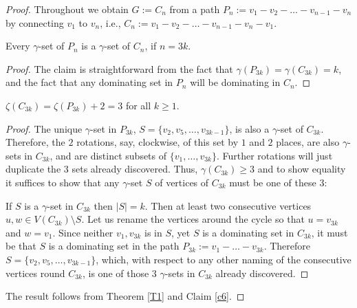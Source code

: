 \documentclass[twoside,12pt]{article}
\begin{document}
\begin{proof}
	Throughout we obtain $G:=C_n$ from a path $P_{n}:=v_1-v_2-\ldots-v_{n-1}-v_{n}$ by connecting $v_1$ to $v_n$, i.e., $C_{n}:=v_1-v_2-\ldots-v_{n-1}-v_{n}-v_1$.
	\begin{claim}{\label{c5}}
		Every $\gamma$-set of $P_n$ is a $\gamma$-set of $C_n$, if $n=3k$.
	\end{claim}
	\begin{proof}
		The claim is straightforward from the fact that $\gamma(P_{3k})=\gamma(C_{3k})=k$, and the fact that any dominating set in $P_n$ will be dominating in $C_n$.
	\end{proof}

	\begin{claim}{\label{c6}}
		$\zeta(C_{3k})=\zeta(P_{3k})+2 = 3$ for all $k\ge 1$.  
	\end{claim}
	\begin{proof}
	The unique $\gamma$-set in $P_{3k}$, $S=\{v_2,v_5,\ldots,v_{3k-1}\}$, is also a $\gamma$-set of $C_{3k}$. Therefore, the $2$ rotations, say, clockwise, of this set by $1$ and $2$ places, are also $\gamma$-sets in $C_{3k}$, and are distinct subsets of $\{v_1,\ldots,v_{3k}\}$. Further rotations will just duplicate the $3$ sets already discovered. Thus, $\gamma(C_{3k})\ge 3$ and to show equality it suffices to show that any $\gamma$-set $S$ of vertices of  $C_{3k}$ must be one of these $3$:
	
	If $S$ is a $\gamma$-set in $C_{3k}$ then $|S|=k$. Then at least two consecutive vertices $u, w \in V(C_{3k}) \setminus S$. Let us rename the vertices around the cycle so that $u=v_{3k}$ and $w=v_1$. Since neither $v_1, v_{3k}$ is in $S$, yet $S$ is a dominating set in $C_{3k}$, it must be that $S$ is a dominating set in the path $P_{3k}:=v_1-\ldots-v_{3k}$. Therefore  $S=\{v_2,v_5,\ldots,v_{3k-1}\}$, which, with respect to any other naming of the consecutive vertices round $C_{3k}$, is one of those $3$ $\gamma$-sets in $C_{3k}$ already discovered.

	\end{proof}
	
	The result follows from Theorem \ref{T1} and Claim \ref{c6}.
	
\end{proof}
\end{document}
